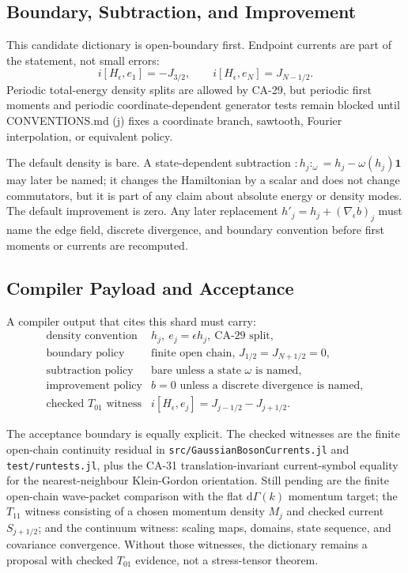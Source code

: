 \subsection{Boundary, Subtraction, and Improvement}

This candidate dictionary is open-boundary first.  Endpoint currents are part of
the statement, not small errors:
\[
  i[H_\epsilon,e_1]=-J_{3/2},
  \qquad
  i[H_\epsilon,e_N]=J_{N-1/2}.
\]
Periodic total-energy density splits are allowed by CA-29, but periodic first
moments and periodic coordinate-dependent generator tests remain blocked until
CONVENTIONS.md (j) fixes a coordinate branch, sawtooth, Fourier interpolation,
or equivalent policy.

The default density is bare.  A state-dependent subtraction
\({:}h_j{:}_\omega=h_j-\omega(h_j)\mathbf 1\) may later be named; it changes the
Hamiltonian by a scalar and does not change commutators, but it is part of any
claim about absolute energy or density modes.  The default improvement is
zero.  Any later replacement \(h'_j=h_j+(\nabla_\epsilon b)_j\) must name the
edge field, discrete divergence, and boundary convention before first moments or
currents are recomputed.

\subsection{Compiler Payload and Acceptance}

A compiler output that cites this shard must carry:
\[
\begin{array}{ll}
\text{density convention} & h_j,\ e_j=\epsilon h_j,\ \text{CA-29 split},\\
\text{boundary policy} & \text{finite open chain, }J_{1/2}=J_{N+1/2}=0,\\
\text{subtraction policy} & \text{bare unless a state }\omega\text{ is named},\\
\text{improvement policy} & b=0\text{ unless a discrete divergence is named},\\
\text{checked }T_{01}\text{ witness} &
  i[H_\epsilon,e_j]=J_{j-1/2}-J_{j+1/2}.
\end{array}
\]

The acceptance boundary is equally explicit.  The checked witnesses are the
finite open-chain continuity residual in \texttt{src/GaussianBosonCurrents.jl}
and \texttt{test/runtests.jl}, plus the CA-31 translation-invariant
current-symbol equality for the nearest-neighbour Klein-Gordon orientation.
Still pending are the finite open-chain wave-packet comparison with the flat
\(\mathrm{d}\Gamma(k)\) momentum target; the \(T_{11}\) witness consisting of a
chosen momentum density \(M_j\) and checked current \(S_{j+1/2}\); and the
continuum witness: scaling maps, domains, state sequence, and covariance
convergence.
Without those witnesses, the dictionary remains a proposal with checked
\(T_{01}\) evidence, not a stress-tensor theorem.
